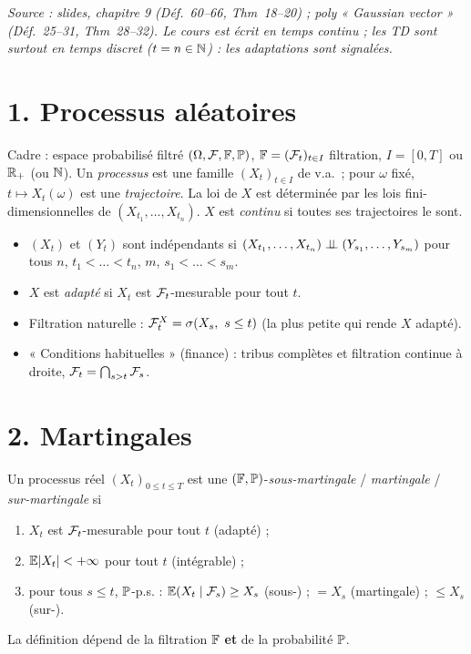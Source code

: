 \documentclass[11pt,a4paper]{article}
\begin{document}

\textit{Source : slides, chapitre 9 (Déf.~60--66, Thm~18--20) ; poly « Gaussian vector » (Déf.~25--31, Thm~28--32).
Le cours est écrit en temps continu ; les TD sont surtout en temps discret ($t=n\in\mathbb{N}$) : les adaptations sont signalées.}

\section*{1. Processus aléatoires}

Cadre : espace probabilisé filtré $(\Omega,\mathcal{F},\mathbb{F},\mathbb{P})$, $\mathbb{F}=(\mathcal{F}_t)_{t\in I}$ filtration, $I=[0,T]$ ou $\mathbb{R}_+$ (ou $\mathbb{N}$).
Un \emph{processus} est une famille $(X_t)_{t\in I}$ de v.a.\ ; pour $\omega$ fixé, $t\mapsto X_t(\omega)$ est une \emph{trajectoire}.
La loi de $X$ est déterminée par les lois fini-dimensionnelles de $(X_{t_1},\dots,X_{t_n})$.
$X$ est \emph{continu} si toutes ses trajectoires le sont.

\begin{definition}\label{C8:adapte}\leavevmode
\begin{itemize}
  \item $(X_t)$ et $(Y_t)$ sont indépendants si $(X_{t_1},\dots,X_{t_n})\perp\!\!\!\perp(Y_{s_1},\dots,Y_{s_m})$ pour tous $n$, $t_1<\dots<t_n$,
  $m$, $s_1<\dots<s_m$.
  \item $X$ est \emph{adapté} si $X_t$ est $\mathcal{F}_t$-mesurable pour tout $t$.
  \item Filtration naturelle : $\mathcal{F}^X_t=\sigma(X_s,\ s\le t)$ (la plus petite qui rende $X$ adapté).
  \item « Conditions habituelles » (finance) : tribus complètes et filtration continue à droite, $\mathcal{F}_t=\bigcap_{s>t}\mathcal{F}_s$.
\end{itemize}
\end{definition}

\section*{2. Martingales}

\begin{definition}\label{C8:mart}
Un processus réel $(X_t)_{0\le t\le T}$ est une $(\mathbb{F},\mathbb{P})$-\emph{sous-martingale} / \emph{martingale} / \emph{sur-martingale} si
\begin{enumerate}[label=(\roman*)]
  \item $X_t$ est $\mathcal{F}_t$-mesurable pour tout $t$ (adapté) ;
  \item $\mathbb{E}|X_t|<+\infty$ pour tout $t$ (intégrable) ;
  \item pour tous $s\le t$, $\mathbb{P}$-p.s. : $\mathbb{E}(X_t\mid\mathcal{F}_s)\ge X_s$ (sous-) ; $=X_s$ (martingale) ; $\le X_s$ (sur-).
\end{enumerate}
La définition dépend de la filtration $\mathbb{F}$ \textbf{et} de la probabilité $\mathbb{P}$.
\end{definition}
\end{document}
